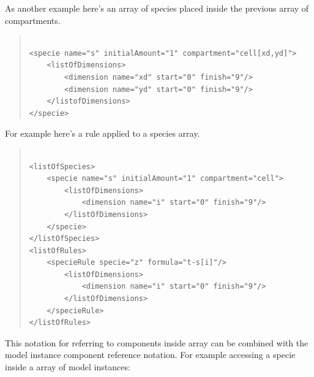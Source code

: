 \documentclass[10pt]{article}
\newcommand{\tightspacing}{\renewcommand{\baselinestretch}{0.85}}
\newcommand{\regularspacing}{\renewcommand{\baselinestretch}{1.0}}
\begin{document}
As another example here's an array of species placed inside the
previous array of compartments.

\begin{quote}
  \begin{small}
    \tightspacing

\begin{verbatim}

<specie name="s" initialAmount="1" compartment="cell[xd,yd]">
    <listOfDimensions>
        <dimension name="xd" start="0" finish="9"/>
        <dimension name="yd" start="0" finish="9"/>
    </listofDimensions>
</specie>

\end{verbatim}

    \regularspacing
  \end{small}
\end{quote}

For example here's a rule applied to a species array.

\begin{quote}
  \begin{small}
    \tightspacing

\begin{verbatim}

<listOfSpecies>
    <specie name="s" initialAmount="1" compartment="cell">
        <listOfDimensions>
            <dimension name="i" start="0" finish="9"/>
        </listOfDimensions>
    </specie>
</listOfSpecies>
<listOfRules>
    <specieRule specie="z" formula="t-s[i]"/>
        <listOfDimensions>
            <dimension name="i" start="0" finish="9"/>
        </listOfDimensions>
    </specieRule>
</listOfRules>

\end{verbatim}

    \regularspacing
  \end{small}
\end{quote}

This notation for referring to components inside array can be
combined with the model instance component reference notation. For example accessing a specie inside a array of model instances:
\end{document}
